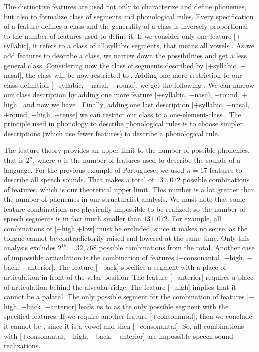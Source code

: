 The distinctive features are used not only to characterize and define phonemes, but also to formalize class of segments and phonological rules. Every specification of a feature defines a class and the generality of a class is inversely proportional to the number of features used to define it. If we consider only one feature [$+$syllabic], it refers to a class of all syllabic segments, that means all vowels . As we add features to describe a class, we narrow down the possibilities and get a less general class. Considering now the class of segments described by [$+$syllabic, $-$nasal], the class will be now restricted to . Adding one more restriction to our class definition [$+$syllabic, $-$nasal, $+$round], we get the following . We can narrow our class description by adding one more feature  [$+$syllabic, $-$nasal, $+$round, $+$high], and now we have . Finally, adding one last description [$+$syllabic, $-$nasal, $+$round, $+$high, $-$tense] we can restrict our class to a one-element-class . The principle used in phonology to describe phonological rules is to choose simpler descriptions (which use fewer features) to describe a phonological rule.

The feature theory provides an upper limit to the number of possible phonemes, that is $2^n$, where $n$ is the number of features used to describe the sounds of a language. For the previous example of Portuguese, we used $n=17$ features to describe all speech sounds. That makes a total of $131,072$ possible combinations of features, which is our theoretical upper limit. This number is a lot greater than the number of phonemes in our structuralist analysis. We must note that some feature combinations are physically impossible to be realized, so the number of speech segments is in fact much smaller than $131,072$. For example, all combinations of [$+$high,$+$low] must be excluded, since it makes no sense, as the tongue cannot be contradictorily raised and lowered at the same time. Only this analysis excludes $2^{15} = 32,768$ possible combinations from the total. Another case of impossible articulation is the combination of features [$+$consonantal, $-$high, $-$back, $-$anterior]. The feature [$-$back] specifies a segment with a place of articulation in front of the velar position. The feature [$-$anterior] requires a place of articulation behind the alveolar ridge. The feature [$-$high] implies that it cannot be a palatal. The only possible segment for the combination of features [$-$high, $-$back, $-$anterior] leads us to \textipa{[e]} as the only possible segment with the specified features. If we require another feature [$+$consonantal], then we conclude it cannot be \textipa{[e]}, since it is a vowel and then [$-$consonantal]. So, all combinations with [$+$consonantal, $-$high, $-$back, $-$anterior] are impossible speech sound realizations. 

